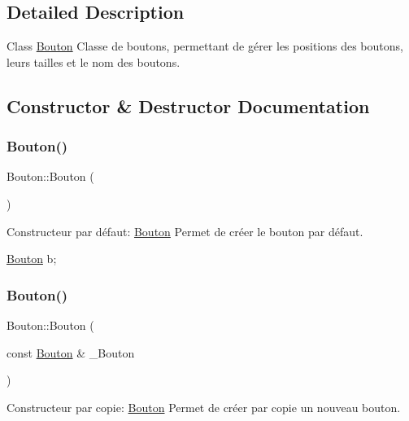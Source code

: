 \subsection{Detailed Description}
Class \hyperlink{classBouton}{Bouton} Classe de boutons, permettant de gérer les positions des boutons, leurs tailles et le nom des boutons. 

\subsection{Constructor \& Destructor Documentation}
\mbox{\label{classBouton_ad1e4f684cad81db47393df0be7a65658}} 
\subsubsection{\texorpdfstring{Bouton()}{Bouton()}\hspace{0.1cm}{\footnotesize\ttfamily [1/3]}}
{\footnotesize\ttfamily Bouton\+::\+Bouton (\begin{DoxyParamCaption}{ }\end{DoxyParamCaption})}



Constructeur par défaut\+: \hyperlink{classBouton}{Bouton} Permet de créer le bouton par défaut. 


\begin{DoxyCode}
\hyperlink{classBouton}{Bouton} b;
\end{DoxyCode}
 \mbox{\label{classBouton_adbbccfea61e26714d2271f1ce097b353}} 
\subsubsection{\texorpdfstring{Bouton()}{Bouton()}\hspace{0.1cm}{\footnotesize\ttfamily [2/3]}}
{\footnotesize\ttfamily Bouton\+::\+Bouton (\begin{DoxyParamCaption}\item[{const \hyperlink{classBouton}{Bouton} \&}]{\+\_\+\+Bouton }\end{DoxyParamCaption})}



Constructeur par copie\+: \hyperlink{classBouton}{Bouton} Permet de créer par copie un nouveau bouton. 


